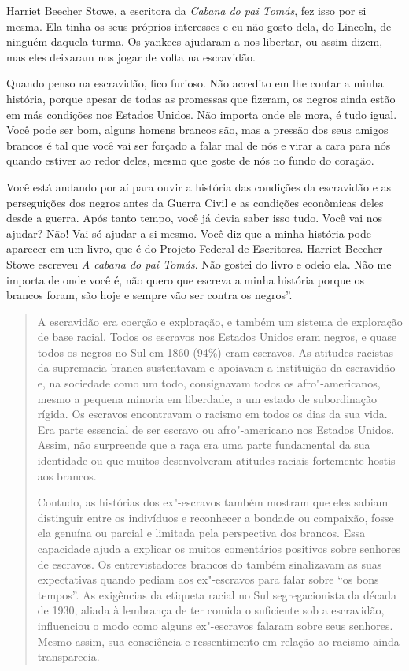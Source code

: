 Harriet Beecher Stowe, a escritora da \emph{Cabana do pai Tomás}, fez
isso por si mesma. Ela tinha os seus próprios interesses e eu não gosto
dela, do Lincoln, de ninguém daquela turma. Os yankees ajudaram a nos
libertar, ou assim dizem, mas eles deixaram nos jogar de volta na
escravidão.

Quando penso na escravidão, fico furioso. Não acredito em lhe contar a
minha história, porque apesar de todas as promessas que fizeram, os
negros ainda estão em más condições nos Estados Unidos. Não importa onde
ele mora, é tudo igual. Você pode ser bom, alguns homens brancos são,
mas a pressão dos seus amigos brancos é tal que você vai ser forçado a
falar mal de nós e virar a cara para nós quando estiver ao redor deles,
mesmo que goste de nós no fundo do coração.

Você está andando por aí para ouvir a história das condições da
escravidão e as perseguições dos negros antes da Guerra Civil e as
condições econômicas deles desde a guerra. Após tanto tempo, você já
devia saber isso tudo. Você vai nos ajudar? Não! Vai só ajudar a si
mesmo. Você diz que a minha história pode aparecer em um livro, que é do
Projeto Federal de Escritores. Harriet Beecher Stowe escreveu \emph{A
cabana do pai Tomás}. Não gostei do livro e odeio ela. Não me importa de
onde você é, não quero que escreva a minha história porque os brancos
foram, são hoje e sempre vão ser contra os negros''.

\begin{quote}
A escravidão era coerção e exploração, e também um sistema de
exploração de base racial. Todos os escravos nos Estados Unidos eram
negros, e quase todos os negros no Sul em 1860 (94\%) eram escravos. As
atitudes racistas da supremacia branca sustentavam e apoiavam a
instituição da escravidão e, na sociedade como um todo, consignavam
todos os afro"-americanos, mesmo a pequena minoria em liberdade, a um
estado de subordinação rígida. Os escravos encontravam o racismo em
todos os dias da sua vida. Era parte essencial de ser escravo ou
afro"-americano nos Estados Unidos. Assim, não surpreende que a raça era
uma parte fundamental da sua identidade ou que muitos desenvolveram
atitudes raciais fortemente hostis aos brancos.

Contudo, as histórias dos ex"-escravos também mostram que eles
sabiam distinguir entre os indivíduos e reconhecer a bondade ou
compaixão, fosse ela genuína ou parcial e limitada pela perspectiva dos
brancos. Essa capacidade ajuda a explicar os muitos comentários
positivos sobre senhores de escravos. Os entrevistadores brancos do 
também sinalizavam as suas expectativas quando pediam aos ex"-escravos
para falar sobre ``os bons tempos''. As exigências da etiqueta racial no
Sul segregacionista da década de 1930, aliada à lembrança de ter comida
o suficiente sob a escravidão, influenciou o modo como alguns
ex"-escravos falaram sobre seus senhores. Mesmo assim, sua consciência e
ressentimento em relação ao racismo ainda transparecia.
\end{quote}

